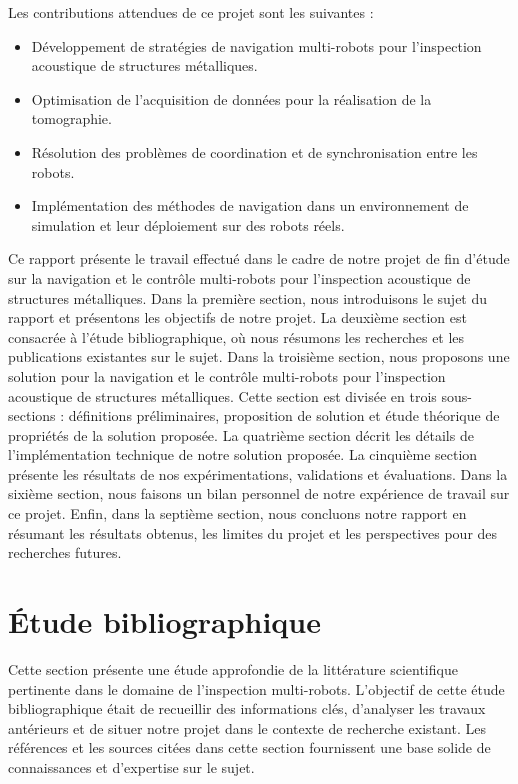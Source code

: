 \documentclass[francais,RandD]{rapportPFE}
\begin{document}
		Les contributions attendues de ce projet sont les suivantes :
		\begin{itemize}
			\item Développement de stratégies de navigation multi-robots pour l'inspection acoustique de structures métalliques.
			\item Optimisation de l'acquisition de données pour la réalisation de la tomographie.
			\item Résolution des problèmes de coordination et de synchronisation entre les robots.
			\item Implémentation des méthodes de navigation dans un environnement de simulation et leur déploiement sur des robots réels.
		\end{itemize}

		Ce rapport présente le travail effectué dans le cadre de notre projet de fin d'étude sur la navigation et le contrôle multi-robots pour l'inspection acoustique de structures métalliques.
		Dans la première section, nous introduisons le sujet du rapport et présentons les objectifs de notre projet.
		La deuxième section est consacrée à l'étude bibliographique, où nous résumons les recherches et les publications existantes sur le sujet.
		Dans la troisième section, nous proposons une solution pour la navigation et le contrôle multi-robots pour l'inspection acoustique de structures métalliques.
		Cette section est divisée en trois sous-sections : définitions préliminaires, proposition de solution et étude théorique de propriétés de la solution proposée.
		La quatrième section décrit les détails de l'implémentation technique de notre solution proposée.
		La cinquième section présente les résultats de nos expérimentations, validations et évaluations.
		Dans la sixième section, nous faisons un bilan personnel de notre expérience de travail sur ce projet.
		Enfin, dans la septième section, nous concluons notre rapport en résumant les résultats obtenus, les limites du projet et les perspectives pour des recherches futures.
	\section{Étude bibliographique}
		Cette section présente une étude approfondie de la littérature scientifique pertinente dans le domaine de l'inspection multi-robots.
		L'objectif de cette étude bibliographique était de recueillir des informations clés, d'analyser les travaux antérieurs et de situer notre projet dans le contexte de recherche existant.
		Les références et les sources citées dans cette section fournissent une base solide de connaissances et d'expertise sur le sujet.
\end{document}

